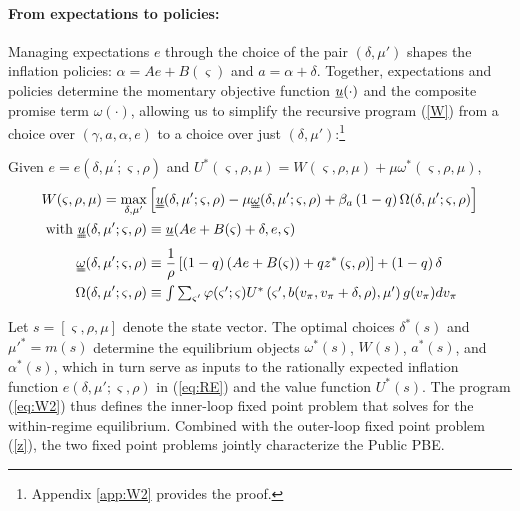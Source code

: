 \documentclass[12pt,letter,leqno]{article}
\theoremstyle{asn}
\theoremstyle{lem}
\theoremstyle{slem}
\theoremstyle{prop}
\theoremstyle{appprop}
\theoremstyle{rem}
\theoremstyle{defn}
\begin{document}
\paragraph{From expectations to policies:} Managing expectations $e$ through the choice of the pair $(\delta, \mu')$ shapes the inflation policies: $\alpha = Ae + B(\varsigma)$ and $a = \alpha + \delta$. Together, expectations and policies determine the momentary objective function $\uline{u}(\cdot)$ and the composite promise term $\omega(\cdot)$, allowing us to simplify the recursive program (\ref{W}) from a choice over $(\gamma, a, \alpha, e)$ to a choice over just $(\delta, \mu')$:\footnote{Appendix \ref{app:W2} provides the proof.} 
\begin{prop}\label{prop:W2}%
Given $e =e\left( \delta ,\mu ^{\prime };\varsigma ,\rho \right)$ and $U^*\left( \varsigma ,\rho ,\mu \right)=W(\varsigma,\rho,\mu)+\mu\omega^*(\varsigma,\rho,\mu)$, 
\begin{align}
W(\varsigma,\rho,\mu) =\max_{\delta,\mu^{\prime}}&\left[\uuline{u}(
\delta ,\mu ^{\prime };\varsigma,\rho) -\mu \uuline{\omega}(\delta,\mu^{\prime
};\varsigma,\rho)+\beta_{a}\left( 1-q\right) \Omega( \delta ,\mu ^{\prime
};\varsigma,\rho) \right] \label{eq:W2} \\
\text{with }\uuline{u}(\delta,\mu';\varsigma,\rho) &\equiv \uline{u}(Ae+B(\varsigma)+\delta,e,\varsigma) \notag \\
\uuline{\omega}(\delta,\mu';\varsigma,\rho) &\equiv \frac{1}{\rho }\left[
\left( 1-q\right) \left( Ae+B(\varsigma )\right) +qz^{\ast }\left( \varsigma
,\rho \right) \right] +\left( 1-q\right) \delta \notag  \\
\Omega( \delta ,\mu ^{\prime} ;\varsigma,\rho )  &\equiv \textstyle\int \textstyle\sum_{\varsigma^{\prime
}}\varphi( \varsigma ^{\prime };\varsigma ) U^*\left( \varsigma
^{\prime },b( v_\pi ,v_\pi+\delta ,\rho) ,\mu ^{\prime }\right) g (v_\pi )dv_\pi \notag 
\end{align}
\end{prop}
Let $s = [\varsigma, \rho, \mu]$ denote the state vector. The optimal choices $\delta^*(s)$ and $\mu'^* = m(s)$ determine the equilibrium objects $\omega^*(s)$, $W(s)$, $a^*(s)$, and $\alpha^*(s)$, which in turn serve as inputs to the rationally expected inflation function $e(\delta, \mu'; \varsigma, \rho)$ in (\ref{eq:RE}) and the value function $U^*(s)$. The program (\ref{eq:W2}) thus defines the inner-loop fixed point problem that solves for the within-regime equilibrium. Combined with the outer-loop fixed point problem (\ref{z}), the two fixed point problems jointly characterize the Public PBE.
\end{document}

